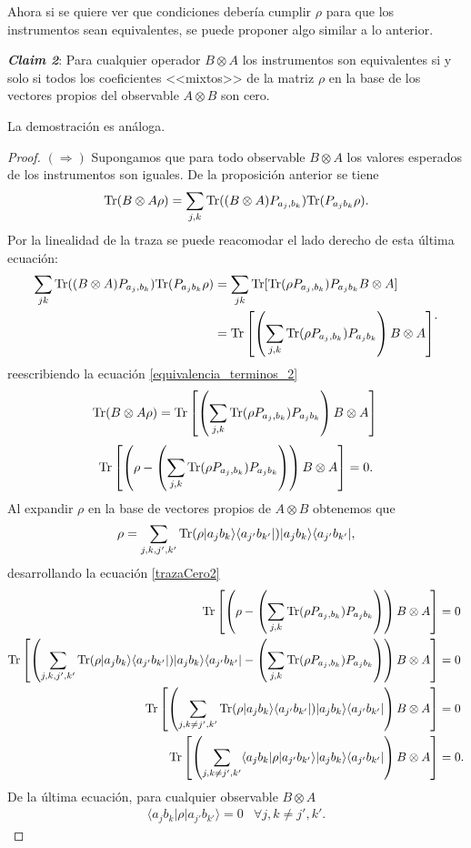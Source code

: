 \documentclass[12pt,oneside]{book}\raggedbottom{}
\begin{document}
Ahora si se quiere ver que condiciones debería cumplir $\rho$ para que los instrumentos sean equivalentes, se puede proponer algo similar a lo anterior.

\textbf{\textit{Claim 2}}: Para cualquier operador $B\otimes A$ los instrumentos son equivalentes si y solo si todos los coeficientes <<mixtos>> de la matriz $\rho$ en la base de los vectores propios del observable $A\otimes B$ son cero.

La demostración es análoga.

\begin{proof}$(\Rightarrow)$ Supongamos que para todo observable $B\otimes A$ los valores esperados de los instrumentos son iguales. De la proposición anterior se tiene  \begin{equation}\label{equivalencia_terminos_2}{\rm Tr}(B\otimes A \rho)=\sum_{j,k}{\rm Tr}((B\otimes A) P_{a_j,b_k}){\rm Tr}(P_{a_j b_k}\rho ).\end{equation} Por la linealidad de la traza se puede reacomodar el lado derecho de esta última ecuación: \[\begin{split}\sum_{jk}{\rm Tr}((B\otimes A) P_{a_j,b_k}){\rm Tr}(P_{a_j b_k}\rho )&= \sum_{jk}{\rm Tr}[{\rm Tr}(\rho P_{a_j,b_k})P_{a_j b_k}B\otimes A ]\\
	&={\rm Tr}\left[\left(\sum_{j,k}{\rm Tr}(\rho P_{a_j,b_k})P_{a_j b_k}\right)B\otimes A  \right]\end{split}.\]  reescribiendo la ecuación {\ref{equivalencia_terminos_2}} 
	\[{\rm Tr}(B\otimes A \rho)={\rm Tr}\left[\left(\sum_{j,k}{\rm Tr}(\rho P_{a_j,b_k})P_{a_j b_k}\right)B\otimes A \right]\\ \]
\begin{equation}\label{trazaCero2}\begin{split}
	{\rm Tr}\left[\left(\rho-\left(\sum_{j,k}{\rm Tr}(\rho P_{a_j,b_k})P_{a_j b_k}\right)\right)B\otimes A\right]=0\\ \end{split}.\end{equation}
	Al expandir $\rho$ en la base de vectores propios de $A\otimes B$ obtenemos que \[\rho=\sum_{j,k,j',k'}{\rm Tr}(\rho |a_j b_k\rangle \langle a_{j'}b_{k'}|)|a_j b_k\rangle \langle a_{j'}b_{k'}|,\] desarrollando la ecuación {\ref{trazaCero2}}   
\[\begin{split}
	{\rm Tr}\left[\left(\rho-\left(\sum_{j,k}{\rm Tr}(\rho P_{a_j,b_k})P_{a_j b_k}\right)\right)B\otimes A\right]&=0\\
{\rm Tr}\left[\left(\sum_{j,k,j',k'}{\rm Tr}(\rho |a_j b_k\rangle \langle a_{j'}b_{k'}|)|a_j b_k\rangle \langle a_{j'}b_{k'}|-\left(\sum_{j,k}{\rm Tr}(\rho P_{a_j,b_k})P_{a_j b_k}\right)\right)B\otimes A\right]&=0\\
{\rm Tr}\left[\left(\sum_{j,k\ne j',k'}{\rm Tr}(\rho |a_j b_k\rangle \langle a_{j'}b_{k'}|)|a_j b_k\rangle \langle a_{j'}b_{k'}|\right)B\otimes A \right]&=0\\
{\rm Tr}\left[\left(\sum_{j,k\ne j',k'}  \langle a_j b_k |\rho|a_{j'}b_{k'}\rangle |a_j b_k\rangle \langle a_{j'}b_{k'}|\right)B\otimes A\right]&=0.\\
\end{split}\]
De la última ecuación, para cualquier observable $B\otimes A$
 \[\begin{array}{cc}
	\langle a_j b_k |\rho|a_{j'}b_{k'}\rangle=0& \forall j,k\ne j',k'.\end{array}\]


\end{proof}
\end{document}
